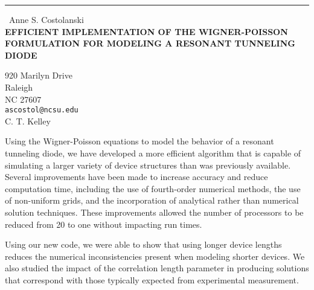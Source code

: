 \documentclass{report}
\begin{document}
\begin{center}
\rule{6in}{1pt} \
{\large Anne S. Costolanski \\
{\bf EFFICIENT IMPLEMENTATION OF THE WIGNER-POISSON FORMULATION FOR MODELING A RESONANT TUNNELING DIODE }}

920 Marilyn Drive \\ Raleigh \\ NC 27607
\\
{\tt ascostol@ncsu.edu}\\
C. T. Kelley\end{center}

Using the Wigner-Poisson equations to model the behavior of a resonant
tunneling diode, we have developed a more efficient algorithm that is
capable of simulating a larger variety of device structures than was
previously available. Several improvements have been made to increase
accuracy and reduce computation time, including the use of fourth-order
numerical methods, the use of non-uniform grids, and the incorporation of
analytical rather than numerical solution techniques. These improvements
allowed the number of processors to be reduced from 20 to one without
impacting run times.

Using our new code, we were able to show that using longer device lengths
reduces the numerical inconsistencies present when modeling shorter
devices. We also studied the impact of the correlation length parameter
in producing solutions that correspond with those typically expected from
experimental measurement.
\end{document}
